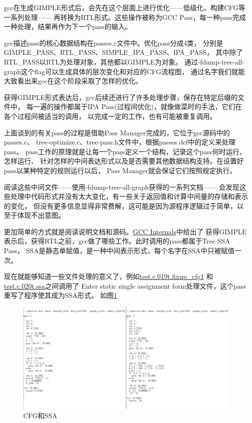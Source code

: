 \documentclass[UTF8,a4paper,10pt]{ctexart}
\begin{document}
gcc在生成GIMPLE形式后，会先在这个层面上进行优化——低级化、构建CFG等一系列处理——
再转换为RTL形式。这些操作被称为GCC Pass，每一种pass完成一种处理，结果再作为下一个pass的输入。
\par
gcc描述pass的核心数据结构在passes.c文件中。优化pass分成4类，
分别是GIMPLE\_PASS、RTL\_PASS、SIMPLE\_IPA\_PASS、IPA\_PASS，
其中除了RTL\_PASS以RTL为处理对象，其他都以GIMPLE为对象。
通过-fdump-tree-all-graph这个flag可以生成具体的层次变化和对应的CFG流程图，
通过名字我们就能大致看出来gcc在这个阶段采取了怎样的优化。
\par
获得GIMPLE形式表达后，gcc后续还进行了许多处理步骤，保存在特定后缀的文件中，
每一遍的操作都属于IPA Pass(过程间优化)，就像做菜时的手法，它们在各个过程间被适当的调用，
以完成一定的工作，也有可能被重复调用。
\par
上面谈到的有关pass的过程是借助Pass Manager完成的，它位于gcc源码中的passes.c、
tree-optimize.c、tree-pass.h文件中，根据passes.def中的定义来处理pass。
pass工作的原理就是让每一个pass定义一个结构，记录这个pass何时运行、怎样运行、
针对怎样的中间表达形式以及是否需要其他数据结构支持。在设置好pass以某种特定的规则运行以后，
Pass Manager就会保证它们按照规定执行。
\par
阅读这些中间文件——使用-fdump-tree-all-graph获得的一系列文档——
会发现这些处理中代码形式并没有太大变化，有一些关于返回值和计算中间量的存储和表示的变化，
但没有更多信息显得非常费解，这可能是因为源程序逻辑过于简单，以至于体现不出意图。
\par
更加简单的方式就是阅读说明文档和源码。\href{run:./gccint.pdf}{GCC Internals}中给出了
获得GIMPLE表示后，获得RTL之前，gcc做了哪些工作。此时调用的pass都属于Tree SSA Pass，
SSA是静态单赋值，是一种中间表示形式，每个名字在SSA中只被赋值一次。
\par
现在就能够知道一些文件处理的意义了，例如\href{run:./test/all/test.c.019t.fixup\_cfg1}{test.c.019t.fixup\_cfg1}
和\href{run:./test/all/test.c.020t.ssa}{test.c.020t.ssa}之间调用了
Enter static single assignment form处理文件，这个pass重写了程序使其成为SSA形式。
如图\ref{fig:2}
\begin{figure}[H]
  \centering
  \includegraphics[scale=0.4]{cfg_vs_ssa.png}
  \caption{CFG和SSA}
  \label{fig:2}
\end{figure}
\end{document}
